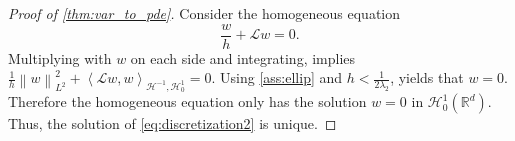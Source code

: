 \documentclass[11pt,a4paper,reqno]{amsart}
\numberwithin{equation}{section}
\theoremstyle{plain}
\theoremstyle{definition}
\def\ud{\mathrm d}
\newcommand{\ip}[1]{\left\langle#1\right\rangle}
\newcommand{\tsigma}{\tilde \sigma }
\newcommand{\cL}{\mathcal{L}}
\newcommand{\cH}{\mathcal{H}}
\newcommand{\R}{\mathbb{R}}
\newcommand{\norm}[1]{\left\|#1 \right\|} %
\begin{document}
\begin{proof}[Proof of \cref{thm:var_to_pde}]
Consider the homogeneous equation 
\[
 \frac{w}{h} +\cL w = 0.
\]
Multiplying with $w$ on each side and integrating, implies $\frac{1}{h}\norm{w}^2_{L^2} + \ip{\cL  w,  w}_{\cH^{-1},\cH_0^1}  = 0$. 
Using \cref{ass:ellip} and $h< \frac{1}{2\lambda_2} $, yields that $w=0.$ 
Therefore the homogeneous equation only has the solution $w=0$ in $\mathcal{H}_0^1 (\R^d)$. 
Thus, the solution of \eqref{eq:discretization2} is unique.
%


\end{proof}
\end{document}
